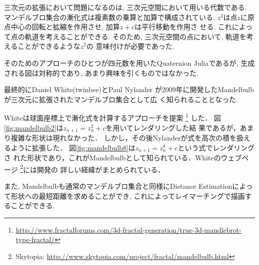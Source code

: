 三次元の拡張において問題になるのは, 三次元空間において用いる代数である.
マンデルブロ集合の漸化式は複素数の乗算と加算で構成されている.
$z^2$は点$z$に原点中心の回転と拡縮を作用させ, 加算$z + c$は平行移動を作用さ
せる. これによって点の軌道を考えることができる.
そのため, 三次元空間の点において, 軌道を考えることができるような$z^2$の
意味付けが必要であった.

そのためのアプローチのひとつが四元数を用いたQuaternion Juliaであるが,
生成される図は対称的であり, あまり興味を引くものではなかった.

最終的にDaniel White(twinbee)とPaul Nylander
が2009年に開発したMandelbulbが三次元に拡張されたマンデルブロ集合として広
く知られることとなった.

Whiteは球面座標上で漸化式を計算するアプローチを提案
\footnote{\url{http://www.fractalforums.com/3d-fractal-generation/true-3d-mandlebrot-type-fractal/}}
した．
図\ref{fig:mandelbulb2}は$z_{n+1} = z_n^2 + c$を用いてレンダリングした結
果であるが，あまり複雑な形状は現れなかった．
しかし，その後Nylanderが式を高次の積を扱えるように拡張した．
図\ref{fig:mandelbulb8}は$z_{n+1} = z_n^8 + c $という式でレンダリングさ
れた形状であり，これがMandelbulbとして知られている．Whiteのウェブページ
\footnote{Skytopia:
\url{http://www.skytopia.com/project/fractal/mandelbulb.html}}には開発の
詳しい経緯がまとめられている．

また, Mandelbulbも通常のマンデルブロ集合と同様にDistance Estimationによっ
て形状への最短距離を求めることができ, これによってレイマーチングで描画す
ることができる.

